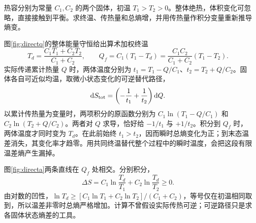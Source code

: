 \begin{example}[两个物体直接接触的熵增]\label{ex:directcontact}
热容分别为常量 $C_1,C_2$ 的两个固体，初温 $T_1>T_2>0$。整体绝热，体积变化可忽略，直接接触到平衡。求终温、传热量和总熵增，并用传热量作积分变量重新推导熵变。
\end{example}
\begin{solution}
图\ref{fig:directq}的整体能量守恒给出算术加权终温
\[
 T_d=\frac{C_1T_1+C_2T_2}{C_1+C_2},\qquad
 Q_f=C_1(T_1-T_d)=\frac{C_1C_2}{C_1+C_2}(T_1-T_2).
\]
实际传递累计热量 $Q$ 时，两体温度分别为 $t_1=T_1-Q/C_1$、$t_2=T_2+Q/C_2$。固体各自可近似均温，取微小状态变化的可逆替代路径，
\[
 \mathop{}\!\mathrm d S_{\rm tot}=\left(-\frac1{t_1}+\frac1{t_2}\right)\mathop{}\!\mathrm d Q.
\]
以累计传热量为变量时，两项积分的原函数分别为 $C_1\ln(T_1-Q/C_1)$ 和 $C_2\ln(T_2+Q/C_2)$。两者对 $Q$ 求导，恰好给 $-1/t_1$ 与 $+1/t_2$。积分到 $Q_f$ 时，两体温度才同时变为 $T_d$。在此前始终 $t_1>t_2$，因而瞬时总熵变化为正；到末态温差消失，其变化率才趋零。用共同终温替代整个过程中的瞬时温度，会把这段有限温差熵产生漏掉。

图\ref{fig:directa}两条直线在 $Q_f$ 处相交。分别积分，
\[
 \Delta S=C_1\ln\frac{T_d}{T_1}+C_2\ln\frac{T_d}{T_2}\ge0.
\]
由对数的凹性，$\ln T_d\ge[C_1\ln T_1+C_2\ln T_2]/(C_1+C_2)$，等号仅在初温相同取到，所以温差非零时总熵严格增加。计算不曾假设实际传热可逆；可逆路径只是求各固体状态熵差的工具。
\end{solution}

